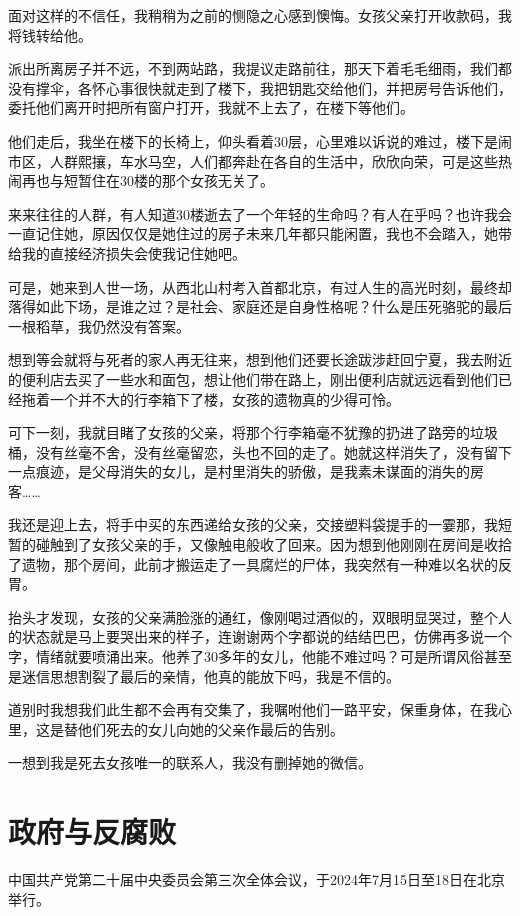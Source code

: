 面对这样的不信任，我稍稍为之前的恻隐之心感到懊悔。女孩父亲打开收款码，我将钱转给他。

派出所离房子并不远，不到两站路，我提议走路前往，那天下着毛毛细雨，我们都没有撑伞，各怀心事很快就走到了楼下，我把钥匙交给他们，并把房号告诉他们，委托他们离开时把所有窗户打开，我就不上去了，在楼下等他们。

他们走后，我坐在楼下的长椅上，仰头看着30层，心里难以诉说的难过，楼下是闹市区，人群熙攘，车水马空，人们都奔赴在各自的生活中，欣欣向荣，可是这些热闹再也与短暂住在30楼的那个女孩无关了。

来来往往的人群，有人知道30楼逝去了一个年轻的生命吗？有人在乎吗？也许我会一直记住她，原因仅仅是她住过的房子未来几年都只能闲置，我也不会踏入，她带给我的直接经济损失会使我记住她吧。

可是，她来到人世一场，从西北山村考入首都北京，有过人生的高光时刻，最终却落得如此下场，是谁之过？是社会、家庭还是自身性格呢？什么是压死骆驼的最后一根稻草，我仍然没有答案。

想到等会就将与死者的家人再无往来，想到他们还要长途跋涉赶回宁夏，我去附近的便利店去买了一些水和面包，想让他们带在路上，刚出便利店就远远看到他们已经拖着一个并不大的行李箱下了楼，女孩的遗物真的少得可怜。

可下一刻，我就目睹了女孩的父亲，将那个行李箱毫不犹豫的扔进了路旁的垃圾桶，没有丝毫不舍，没有丝毫留恋，头也不回的走了。她就这样消失了，没有留下一点痕迹，是父母消失的女儿，是村里消失的骄傲，是我素未谋面的消失的房客……

我还是迎上去，将手中买的东西递给女孩的父亲，交接塑料袋提手的一霎那，我短暂的碰触到了女孩父亲的手，又像触电般收了回来。因为想到他刚刚在房间是收拾了遗物，那个房间，此前才搬运走了一具腐烂的尸体，我突然有一种难以名状的反胃。

抬头才发现，女孩的父亲满脸涨的通红，像刚喝过酒似的，双眼明显哭过，整个人的状态就是马上要哭出来的样子，连谢谢两个字都说的结结巴巴，仿佛再多说一个字，情绪就要喷涌出来。他养了30多年的女儿，他能不难过吗？可是所谓风俗甚至是迷信思想割裂了最后的亲情，他真的能放下吗，我是不信的。

道别时我想我们此生都不会再有交集了，我嘱咐他们一路平安，保重身体，在我心里，这是替他们死去的女儿向她的父亲作最后的告别。

一想到我是死去女孩唯一的联系人，我没有删掉她的微信。

\section{政府与反腐败}

中国共产党第二十届中央委员会第三次全体会议，于2024年7月15日至18日在北京举行。

